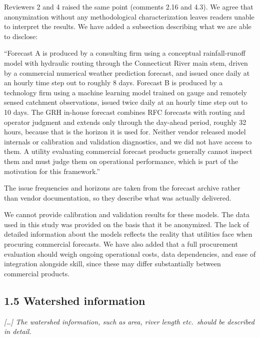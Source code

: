 \documentclass[11pt]{article}
\newenvironment{rc}%
  {\begin{list}{}{\setlength{\leftmargin}{1.5em}\setlength{\rightmargin}{1.5em}%
   \setlength{\topsep}{0.2em}\setlength{\parsep}{0pt}\setlength{\itemsep}{0pt}}%
   \item[]\itshape\color{quotegray}}%
  {\end{list}}
\newenvironment{newtext}%
  {\begin{list}{}{\setlength{\leftmargin}{1.5em}\setlength{\rightmargin}{1.5em}%
   \setlength{\topsep}{0.2em}\setlength{\parsep}{0pt}\setlength{\itemsep}{0pt}}%
   \item[]}%
  {\end{list}}
\begin{document}
Reviewers 2 and 4 raised the same point (comments 2.16 and 4.3). We agree that
anonymization without any methodological characterization leaves readers unable to
interpret the results. We have added a subsection describing what we are able to disclose:

\begin{newtext}
``Forecast A is produced by a consulting firm using a conceptual rainfall-runoff model with
hydraulic routing through the Connecticut River main stem, driven by a commercial numerical
weather prediction forecast, and issued once daily at an hourly time step out to roughly 8
days. Forecast B is produced by a technology firm using a machine learning model trained on
gauge and remotely sensed catchment observations, issued twice daily at an hourly time step out
to 10 days. The GRH in-house forecast combines RFC forecasts with routing and operator
judgment and extends only through the day-ahead period, roughly 32 hours, because that is
the horizon it is used for. Neither vendor released model internals or calibration and
validation diagnostics, and we did not have access to them. A utility evaluating commercial
forecast products generally cannot inspect them and must judge them on operational
performance, which is part of the motivation for this framework.''
\end{newtext}

The issue frequencies and horizons are taken from the forecast archive rather than vendor
documentation, so they describe what was actually delivered.

We cannot provide calibration and validation results for these models. The data used in this study was provided
on the basis that it be anonymized. The lack of detailed information about the models reflects
the reality that utilities face when procuring commercial forecasts. We have also added that a
full procurement evaluation should weigh ongoing operational costs, data dependencies, and ease
of integration alongside skill, since these may differ substantially between commercial
products.

\subsection*{1.5 Watershed information}

\begin{rc}
[\ldots] The watershed information, such as area, river length etc.\ should be
described in detail.
\end{rc}
\end{document}
